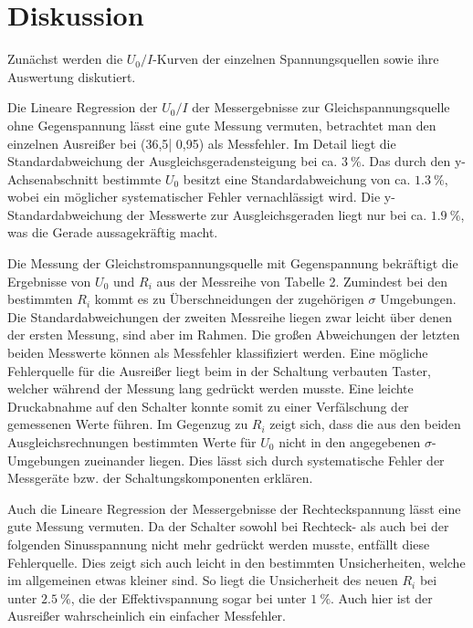 \section{Diskussion}
\label{sec:Diskussion}


Zunächst werden die $U_0/I $-Kurven der einzelnen Spannungsquellen sowie ihre Auswertung diskutiert.

Die Lineare Regression der $U_0 /I$ der Messergebnisse zur Gleichspannungsquelle ohne Gegenspannung lässt eine gute Messung vermuten,
 betrachtet man den einzelnen Ausreißer bei (36,5| 0,95) als Messfehler.
 Im Detail liegt die Standardabweichung der Ausgleichsgeradensteigung bei ca. $\SI{3}{\%}$. Das durch den
 y-Achsenabschnitt bestimmte $U_0$ besitzt eine Standardabweichung von ca. $\SI{1,3}{\%}$, wobei ein möglicher
 systematischer Fehler vernachlässigt wird.
 Die y-Standardabweichung der Messwerte zur Ausgleichsgeraden liegt nur bei ca. $\SI{1,9}{\%}$,
  was die Gerade aussagekräftig macht.


Die Messung der Gleichstromspannungsquelle mit Gegenspannung bekräftigt die Ergebnisse von $U_0$ und $R_i$ aus
der Messreihe von Tabelle 2. Zumindest bei den bestimmten $R_i$ kommt es zu Überschneidungen der zugehörigen
$\sigma$ Umgebungen.
 Die Standardabweichungen der zweiten Messreihe liegen zwar leicht über denen der ersten Messung,
 sind aber im Rahmen.
 Die großen Abweichungen der letzten beiden Messwerte können als Messfehler klassifiziert werden.
 Eine mögliche Fehlerquelle für die Ausreißer liegt beim in der Schaltung verbauten Taster,
  welcher während der Messung lang gedrückt werden musste. Eine leichte Druckabnahme auf den Schalter
  konnte somit zu einer Verfälschung der gemessenen Werte führen.
  Im Gegenzug zu $R_i$ zeigt sich, dass die aus den beiden Ausgleichsrechnungen bestimmten Werte für $U_0$
 nicht in den angegebenen $\sigma$-Umgebungen zueinander liegen.
 Dies lässt sich durch systematische Fehler der Messgeräte bzw. der Schaltungskomponenten erklären.

Auch die Lineare Regression der Messergebnisse der Rechteckspannung lässt eine gute Messung vermuten.
 Da  der Schalter sowohl bei Rechteck- als auch bei der folgenden Sinusspannung nicht mehr gedrückt werden musste,
entfällt diese Fehlerquelle. Dies zeigt sich auch leicht in den bestimmten Unsicherheiten,
welche im allgemeinen etwas kleiner sind. So liegt die Unsicherheit des neuen $R_i$ bei
unter $\SI{2,5}{\%}$, die der Effektivspannung sogar bei unter $\SI{1}{\%}$. Auch hier ist der Ausreißer wahrscheinlich
ein einfacher Messfehler.

